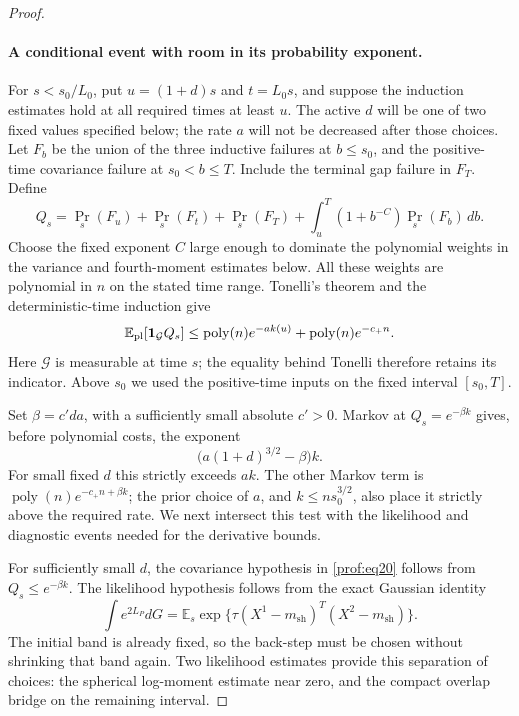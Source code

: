 \begin{proof}
\paragraph{A conditional event with room in its probability exponent.}
For \(s<s_0/L_0\), put \(u=(1+d)s\) and \(t=L_0s\), and suppose the
induction estimates hold at all required times at least \(u\).
The active \(d\) will be one of two fixed values specified below;
the rate \(a\) will not be decreased after those choices.
Let \(F_b\) be the union of the three inductive failures at
\(b\le s_0\), and the positive-time covariance failure at
\(s_0<b\le T\). Include the terminal gap failure in \(F_T\).
Define
\[
 Q_s=\Pr_s(F_u)+\Pr_s(F_t)+\Pr_s(F_T)
       +\int_u^T(1+b^{-C})\Pr_s(F_b)\,db.
\]
Choose the fixed exponent \(C\) large enough to dominate the
polynomial weights in the variance and fourth-moment estimates
below. All these weights are polynomial in \(n\) on the stated
time range. Tonelli's theorem and the deterministic-time induction
give
\[
 \mathbb E_{\rm pl}[\mathbf1_{\mathcal G}Q_s]
 \le \operatorname{poly}(n)e^{-ak(u)}
       +\operatorname{poly}(n)e^{-c_+n}.
\]
Here \(\mathcal G\) is measurable at time \(s\); the equality
behind Tonelli therefore retains its indicator. Above \(s_0\) we
used the positive-time inputs on the fixed interval \([s_0,T]\).

Set \(\beta=c'da\), with a sufficiently small absolute \(c'>0\).
Markov at \(Q_s=e^{-\beta k}\) gives, before polynomial costs, the
exponent
\[
 \bigl(a(1+d)^{3/2}-\beta\bigr)k.
\]
For small fixed \(d\) this strictly exceeds \(ak\).
The other Markov term is
\(\operatorname{poly}(n)e^{-c_+n+\beta k}\); the prior choice of
\(a\), and \(k\le ns_0^{3/2}\), also place it strictly above
the required rate. We next intersect this test with the likelihood
and diagnostic events needed for the derivative bounds.

For sufficiently small \(d\), the covariance hypothesis in
\eqref{prof:eq20} follows from \(Q_s\le e^{-\beta k}\).
The likelihood hypothesis
follows from the exact Gaussian identity
\[
 \int e^{2L_P}dG
 =\mathbb E_s\exp\{\tau(X^1-m_{\mathrm{sh}})^T
                              (X^2-m_{\mathrm{sh}})\}.
\]
The initial band is already fixed, so the back-step must be chosen
without shrinking that band again. Two likelihood estimates provide
this separation of choices: the spherical log-moment estimate near zero,
and the compact overlap bridge on the remaining interval.


\end{proof}
